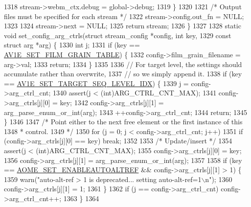 \begin{DoxyCodeInclude}
{{{{{{{{{{{{{{{{1318     stream->webm\_ctx.debug = global->debug;
1319   \}
1320 
1321   \textcolor{comment}{/* Output files must be specified for each stream */}
1322   stream->config.out\_fn = NULL;
1323 
1324   stream->next = NULL;
1325   \textcolor{keywordflow}{return} stream;
1326 \}
1327 
1328 \textcolor{keyword}{static} \textcolor{keywordtype}{void} set\_config\_arg\_ctrls(\textcolor{keyword}{struct} stream\_config *config, \textcolor{keywordtype}{int} key,
1329                                  \textcolor{keyword}{const} \textcolor{keyword}{struct} arg *arg) \{
1330   \textcolor{keywordtype}{int} j;
1331   \textcolor{keywordflow}{if} (key == \hyperlink{group__aom__encoder_ggae78dde67a6d78f332e9bdba0dde42db5ad5846c6f49d37e65a03c39e68d487097}{AV1E\_SET\_FILM\_GRAIN\_TABLE}) \{
1332     config->film\_grain\_filename = arg->val;
1333     \textcolor{keywordflow}{return};
1334   \}
1335 
1336   \textcolor{comment}{// For target level, the settings should accumulate rather than overwrite,}
1337   \textcolor{comment}{// so we simply append it.}
1338   \textcolor{keywordflow}{if} (key == \hyperlink{group__aom__encoder_ggae78dde67a6d78f332e9bdba0dde42db5abc032ee5a8dc3f51ab88b64737590f1b}{AV1E\_SET\_TARGET\_SEQ\_LEVEL\_IDX}) \{
1339     j = config->arg\_ctrl\_cnt;
1340     assert(j < (\textcolor{keywordtype}{int})ARG\_CTRL\_CNT\_MAX);
1341     config->arg\_ctrls[j][0] = key;
1342     config->arg\_ctrls[j][1] = arg\_parse\_enum\_or\_int(arg);
1343     ++config->arg\_ctrl\_cnt;
1344     \textcolor{keywordflow}{return};
1345   \}
1346 
1347   \textcolor{comment}{/* Point either to the next free element or the first instance of this}
1348 \textcolor{comment}{   * control.}
1349 \textcolor{comment}{   */}
1350   \textcolor{keywordflow}{for} (j = 0; j < config->arg\_ctrl\_cnt; j++)
1351     \textcolor{keywordflow}{if} (config->arg\_ctrls[j][0] == key) \textcolor{keywordflow}{break};
1352 
1353   \textcolor{comment}{/* Update/insert */}
1354   assert(j < (\textcolor{keywordtype}{int})ARG\_CTRL\_CNT\_MAX);
1355   config->arg\_ctrls[j][0] = key;
1356   config->arg\_ctrls[j][1] = arg\_parse\_enum\_or\_int(arg);
1357 
1358   \textcolor{keywordflow}{if} (key == \hyperlink{group__aom__encoder_ggae78dde67a6d78f332e9bdba0dde42db5ac8a24393f214823f5a6bd345afb840b6}{AOME\_SET\_ENABLEAUTOALTREF} && config->arg\_ctrls[j][1] > 1) \{
1359     warn(\textcolor{stringliteral}{"auto-alt-ref > 1 is deprecated... setting auto-alt-ref=1\(\backslash\)n"});
1360     config->arg\_ctrls[j][1] = 1;
1361   \}
1362   \textcolor{keywordflow}{if} (j == config->arg\_ctrl\_cnt) config->arg\_ctrl\_cnt++;
1363 \}
1364 
}}}}}}}}}}}}}}}}
\end{DoxyCodeInclude}
